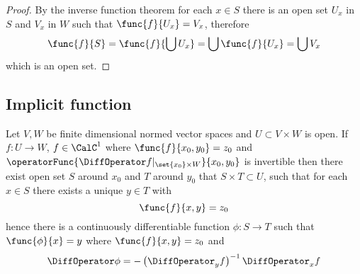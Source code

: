 \begin{proof}
    By the inverse function theorem for each \(x \in S\) there is an open set \(U_x\) in \(S\) and \(V_x\) in \(W\) such that \(\func{f}{U_x} = V_x\), therefore
    \begin{equation*}
        \func{f}{S} =  \func{f}{\bigcup U_x} = \bigcup \func{f}{U_x} = \bigcup V_x
    \end{equation*}
    which is an open set.
\end{proof}

\subsection{Implicit function}
\begin{theorem}
    Let \(V,W\) be finite dimensional normed vector spaces and \(U \subset V \times W\) is open. If \(f: U \to W\), \(f \in \CalC^1\) where \(\func{f}{x_0,y_0} = z_0\) and \(\operatorFunc{\DiffOperator f|_{\set{x_0} \times W}}{x_0,y_0}\) is invertible then there exist open set \(S\) around \(x_0\) and \(T\) around \(y_0\) that \(S \times T \subset U\), such that for each \(x \in S\) there exists a unique \(y \in T\) with
    \begin{equation*}
        \func{f}{x,y} = z_0
    \end{equation*}
    hence there is a continuously differentiable function \(\phi: S \to T\) such that \(\func{\phi}{x} = y\) where \(\func{f}{x,y} = z_0\) and
    \begin{equation*}
        \DiffOperator \phi = - \left(\DiffOperator_y f\right)^{-1} \DiffOperator_x f
    \end{equation*}
\end{theorem}


